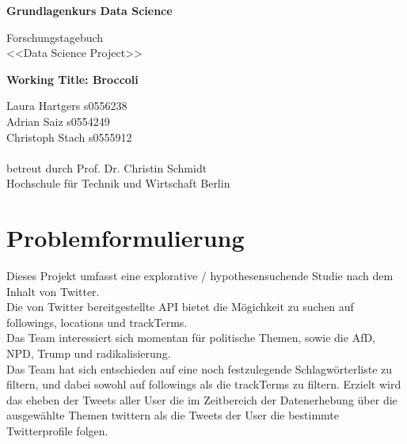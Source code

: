 \documentclass[12pt, 
	a4paper, 
	oneside, 
	leqno]{scrreprt}
\begin{document}
\begin{titlepage}
\begin{center}

\begin{Huge}
\textbf{   Grundlagenkurs Data Science}
\newline\newline
\end{Huge}

\begin{LARGE}
Forschungstagebuch \\
<<Data Science Project>> \\
\end{LARGE}
\vfill
\textbf{Working Title: Broccoli}

\end{center}
\vfill
Laura Hartgers s0556238 \\
Adrian Saiz s0554249 \\
Christoph Stach s0555912 \\
\\
betreut durch Prof. Dr. Christin Schmidt \\
Hochschule für Technik und Wirtschaft Berlin
\end{titlepage}

\setcounter{tocdepth}{2} %
\tableofcontents
\pagebreak

\chapter{Problemformulierung}

Dieses Projekt umfasst eine explorative / hypothesensuchende Studie nach dem Inhalt von Twitter.
\\
Die von Twitter bereitgestellte API bietet die Mögichkeit zu suchen auf followings, locations und trackTerms.
\\
Das Team interessiert sich momentan für politische Themen, sowie die AfD, NPD, Trump und radikalisierung. 
\\
Das Team hat sich entschieden auf eine noch festzulegende Schlagwörterliste zu filtern, und dabei sowohl auf followings als die trackTerms zu filtern. Erzielt wird das eheben der Tweets aller User die im Zeitbereich der Datenerhebung über die ausgewählte Themen twittern als die Tweets der User die bestimmte Twitterprofile folgen.

\end{document}
